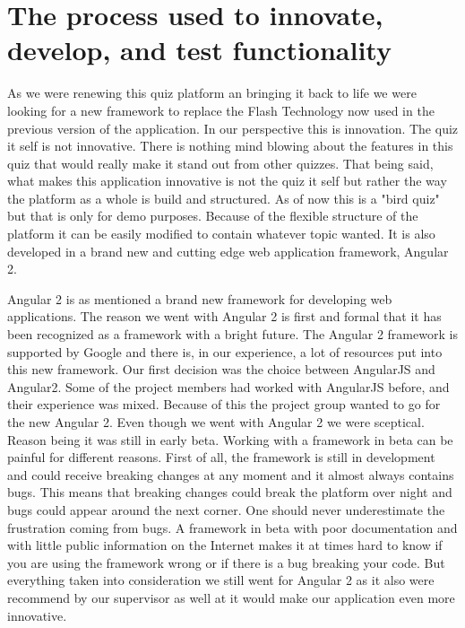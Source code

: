 \section {The process used to innovate, develop, and test functionality}
As we were renewing this quiz platform an bringing it back to life we were looking for a new framework to replace the Flash Technology now used in the previous version of the application. In our perspective this is innovation. The quiz it self is not innovative. There is nothing mind blowing about the features in this quiz that would really make it stand out from other quizzes. That being said, what makes this application innovative is not the quiz it self but rather the way the platform as a whole is build and structured. As of now this is a "bird quiz" but that is only for demo purposes. Because of the flexible structure of the platform it can be easily modified to contain whatever topic wanted. It is also developed in a brand new and cutting edge web application framework, Angular 2\cite{Angular2:online}.

\par
Angular 2 is as mentioned a brand new framework for developing web applications. The reason we went with Angular 2 is first and formal that it has been recognized as a framework with a bright future. The Angular 2 framework is supported by Google and there is, in our experience, a lot of resources put into this new framework. Our first decision was the choice between AngularJS\cite{Angul93:online} and Angular2. Some of the project members had worked with AngularJS before, and their experience was mixed. Because of this the project group wanted to go for the new Angular 2. Even though we went with Angular 2 we were sceptical. Reason being it was still in early beta. Working with a framework in beta can be painful for different reasons. First of all, the framework is still in development and could receive breaking changes at any moment and it almost always contains bugs. This means that breaking changes could break the platform over night and bugs could appear around the next corner. One should never underestimate the frustration coming from bugs. A framework in beta with poor documentation and with little public information on the Internet makes it at times hard to know if you are using the framework wrong or if there is a bug breaking your code. But everything taken into consideration we still went for Angular 2 as it also were recommend by our supervisor as well at it would make our application even more innovative.  

